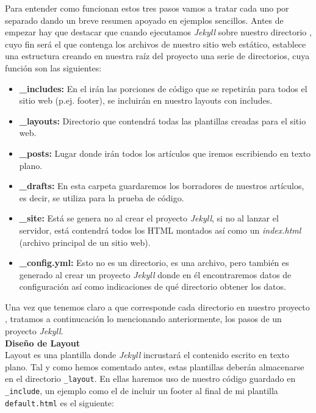 Para entender como funcionan estos tres pasos vamos a tratar cada uno por separado dando un  breve resumen apoyado en ejemplos sencillos. Antes de empezar hay que destacar que cuando ejecutamos \emph{Jekyll} sobre nuestro directorio , cuyo fin será el que contenga los archivos de nuestro sitio web estático, establece una estructura creando en nuestra raíz del proyecto una serie de directorios, cuya función son las siguientes:\\
\begin{itemize}
    \item[] \textbf{\_includes:} En el irán las porciones de código que se repetirán para todos el sitio web (p.ej. footer), se incluirán en nuestro layouts con includes.
    \item[] \textbf{\_layouts:} Directorio que contendrá todas las plantillas creadas para el sitio web.
    \item[] \textbf{\_posts:} Lugar donde irán todos los artículos que iremos escribiendo en texto plano.
    \item[] \textbf{\_drafts:} En esta carpeta guardaremos los borradores de nuestros artículos, es decir, se utiliza para la prueba de código.
    \item[] \textbf{\_site:} Está se genera no al crear el proyecto \emph{Jekyll}, si no al lanzar el servidor, está contendrá todos los HTML montados así como un \textit{index.html} (archivo principal de un sitio web).
    \item[] \textbf{\_config.yml:} Esto no es un directorio, es una archivo, pero también es generado al crear un proyecto \emph{Jekyll} donde en él encontraremos datos de configuración así como indicaciones de qué directorio obtener los datos.
\end{itemize}
Una vez que tenemos claro a que corresponde cada directorio en nuestro proyecto , tratamos a continucación lo mencionando anteriormente, los pasos  de un proyecto \emph{Jekyll}. \\

\textbf{\large{Diseño de Layout}} \\
Layout es una plantilla donde \emph{Jekyll} incrustará el contenido escrito en texto plano. Tal y como hemos comentado antes, estas plantillas deberán almacenarse en el directorio \texttt{\_layout}. En ellas  haremos uso de nuestro código guardado en \texttt{\_include}, un ejemplo como el de incluir un footer al final de mi plantilla \texttt{default.html} es el siguiente:

